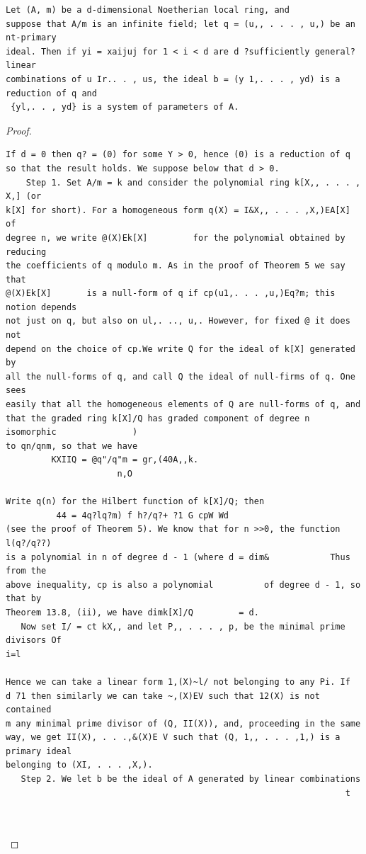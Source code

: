 \begin{theorem}\label{mcrt-auto-theorem-14-14}\uses{}
\begin{verbatim}
Let (A, m) be a d-dimensional Noetherian local ring, and
suppose that A/m is an infinite field; let q = (u,, . . . , u,) be an nt-primary
ideal. Then if yi = xaijuj for 1 < i < d are d ?sufficiently general? linear
combinations of u Ir.. . , us, the ideal b = (y 1,. . . , yd) is a reduction of q and
 {yl,. . , yd} is a system of parameters of A.
\end{verbatim}
\end{theorem}
\begin{proof}
\begin{verbatim}
If d = 0 then q? = (0) for some Y > 0, hence (0) is a reduction of q
so that the result holds. We suppose below that d > 0.
    Step 1. Set A/m = k and consider the polynomial ring k[X,, . . . , X,] (or
k[X] for short). For a homogeneous form q(X) = I&X,, . . . ,X,)EA[X]               of
degree n, we write @(X)Ek[X]         for the polynomial obtained by reducing
the coefficients of q modulo m. As in the proof of Theorem 5 we say that
@(X)Ek[X]       is a null-form of q if cp(u1,. . . ,u,)Eq?m; this notion depends
not just on q, but also on ul,. .., u,. However, for fixed @ it does not
depend on the choice of cp.We write Q for the ideal of k[X] generated by
all the null-forms of q, and call Q the ideal of null-firms of q. One sees
easily that all the homogeneous elements of Q are null-forms of q, and
that the graded ring k[X]/Q has graded component of degree n isomorphic               )
to qn/qnm, so that we have
         KXIIQ = @q"/q"m = gr,(40A,,k.
                      n,O

Write q(n) for the Hilbert function of k[X]/Q; then
          44 = 4q?lq?m) f h?/q?+ ?1 G cpW Wd
(see the proof of Theorem 5). We know that for n >>0, the function l(q?/q??)
is a polynomial in n of degree d - 1 (where d = dim&            Thus from the
above inequality, cp is also a polynomial          of degree d - 1, so that by
Theorem 13.8, (ii), we have dimk[X]/Q         = d.
   Now set I/ = ct kX,, and let P,, . . . , p, be the minimal prime divisors Of
i=l

Hence we can take a linear form 1,(X)~l/ not belonging to any Pi. If
d 71 then similarly we can take ~,(X)EV such that 12(X) is not contained
m any minimal prime divisor of (Q, II(X)), and, proceeding in the same
way, we get II(X), . . .,&(X)E V such that (Q, 1,, . . . ,1,) is a primary ideal
belonging to (XI, . . . ,X,).
   Step 2. We let b be the ideal of A generated by linear combinations
                                                                   t



\end{verbatim}
\end{proof}
